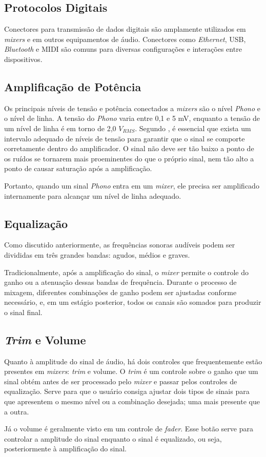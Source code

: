 \subsection{Protocolos Digitais}

Conectores para transmissão de dados digitais são amplamente utilizados em \textit{mixers} e em outros equipamentos de áudio. Conectores como \textit{Ethernet}, USB, \textit{Bluetooth} e MIDI são comuns para diversas configurações e interações entre dispositivos.

\subsection{Amplificação de Potência}

Os principais níveis de tensão e potência conectados a \textit{mixers} são o nível \textit{Phono} e o nível de linha. A tensão do \textit{Phono} varia entre 0,1 e 5 mV, enquanto a tensão de um nível de linha é em torno de 2,0 $V_{RMS}$. Segundo \cite{self2013audio}, é essencial que exista um intervalo adequado de níveis de tensão para garantir que o sinal se comporte corretamente dentro do amplificador. O sinal não deve ser tão baixo a ponto de os ruídos se tornarem mais proeminentes do que o próprio sinal, nem tão alto a ponto de causar saturação após a amplificação. 

Portanto, quando um sinal \textit{Phono} entra em um \textit{mixer}, ele precisa ser amplificado internamente para alcançar um nível de linha adequado.

\subsection{Equalização}

Como discutido anteriormente, as frequências sonoras audíveis podem ser divididas em três grandes bandas: agudos, médios e graves. 

Tradicionalmente, após a amplificação do sinal, o \textit{mixer} permite o controle do ganho ou a atenuação dessas bandas de frequência. Durante o processo de mixagem, diferentes combinações de ganho podem ser ajustadas conforme necessário, e, em um estágio posterior, todos os canais são somados para produzir o sinal final.

\subsection{\textit{Trim} e Volume}
Quanto à amplitude do sinal de áudio, há dois controles que frequentemente estão presentes em \textit{mixers}: \textit{trim} e volume. O \textit{trim} é um controle sobre o ganho que um sinal obtém antes de ser processado pelo \textit{mixer} e passar pelos controles de equalização. Serve para que o usuário consiga ajustar dois tipos de sinais para que apresentem o mesmo nível ou a combinação desejada; uma mais presente que a outra.
\par
Já o volume é geralmente visto em um controle de \textit{fader}. Esse botão serve para controlar a amplitude do sinal enquanto o sinal é equalizado, ou seja, posteriormente à amplificação do sinal.

